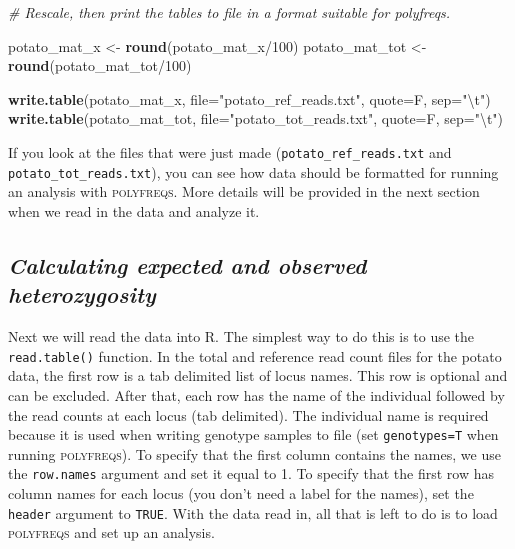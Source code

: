 \documentclass[]{article}
\newenvironment{Shaded}{\begin{snugshade}}{\end{snugshade}}
\newcommand{\KeywordTok}[1]{\textcolor[rgb]{0.13,0.29,0.53}{\textbf{{#1}}}}
\newcommand{\DataTypeTok}[1]{\textcolor[rgb]{0.13,0.29,0.53}{{#1}}}
\newcommand{\DecValTok}[1]{\textcolor[rgb]{0.00,0.00,0.81}{{#1}}}
\newcommand{\CharTok}[1]{\textcolor[rgb]{0.31,0.60,0.02}{{#1}}}
\newcommand{\StringTok}[1]{\textcolor[rgb]{0.31,0.60,0.02}{{#1}}}
\newcommand{\CommentTok}[1]{\textcolor[rgb]{0.56,0.35,0.01}{\textit{{#1}}}}
\newcommand{\NormalTok}[1]{{#1}}
\begin{document}
\begin{Shaded}
\begin{Highlighting}[]
\CommentTok{# Rescale, then print the tables to file in a format suitable for polyfreqs.}

\NormalTok{potato_mat_x <-}\StringTok{ }\KeywordTok{round}\NormalTok{(potato_mat_x/}\DecValTok{100}\NormalTok{)}
\NormalTok{potato_mat_tot <-}\StringTok{ }\KeywordTok{round}\NormalTok{(potato_mat_tot/}\DecValTok{100}\NormalTok{)}

\KeywordTok{write.table}\NormalTok{(potato_mat_x, }\DataTypeTok{file=}\StringTok{"potato_ref_reads.txt"}\NormalTok{, }\DataTypeTok{quote=}\NormalTok{F, }\DataTypeTok{sep=}\StringTok{"}\CharTok{\textbackslash{}t}\StringTok{"}\NormalTok{)}
\KeywordTok{write.table}\NormalTok{(potato_mat_tot, }\DataTypeTok{file=}\StringTok{"potato_tot_reads.txt"}\NormalTok{, }\DataTypeTok{quote=}\NormalTok{F, }\DataTypeTok{sep=}\StringTok{"}\CharTok{\textbackslash{}t}\StringTok{"}\NormalTok{)}
\end{Highlighting}
\end{Shaded}

\newpage

If you look at the files that were just made
(\texttt{potato\_ref\_reads.txt} and \texttt{potato\_tot\_reads.txt}),
you can see how data should be formatted for running an analysis with
\textsc{polyfreqs}. More details will be provided in the next section
when we read in the data and analyze it.

\subsection{\texorpdfstring{\emph{Calculating expected and observed
heterozygosity}}{Calculating expected and observed heterozygosity}}\label{calculating-expected-and-observed-heterozygosity}

Next we will read the data into R. The simplest way to do this is to use
the \texttt{read.table()} function. In the total and reference read
count files for the potato data, the first row is a tab delimited list
of locus names. This row is optional and can be excluded. After that,
each row has the name of the individual followed by the read counts at
each locus (tab delimited). The individual name is required because it
is used when writing genotype samples to file (set \texttt{genotypes=T}
when running \textsc{polyfreqs}). To specify that the first column
contains the names, we use the \texttt{row.names} argument and set it
equal to 1. To specify that the first row has column names for each
locus (you don't need a label for the names), set the \texttt{header}
argument to \texttt{TRUE}. With the data read in, all that is left to do
is to load \textsc{polyfreqs} and set up an analysis.
\end{document}
